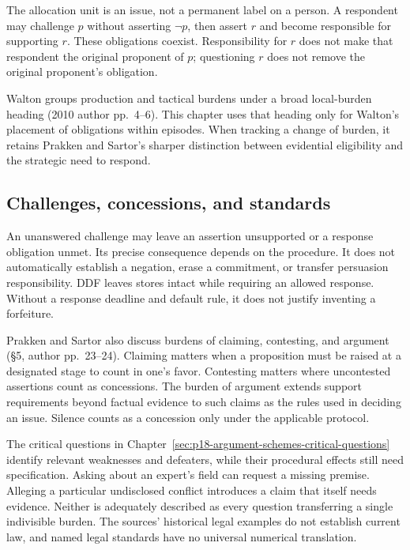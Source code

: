 The allocation unit is an issue, not a permanent label on a person.
A respondent may challenge \(p\) without asserting \(\neg p\), then
assert \(r\) and become responsible for supporting \(r\).
These obligations coexist. Responsibility for \(r\) does not make
that respondent the original proponent of \(p\); questioning \(r\)
does not remove the original proponent's obligation.

Walton groups production and tactical burdens under a broad local-burden
heading (2010 author pp.~4--6). This chapter uses that heading only
for Walton's placement of obligations within episodes. When tracking
a change of burden, it retains Prakken and Sartor's sharper distinction
between evidential eligibility and the strategic need to respond.

\subsection{Challenges, concessions, and standards}

An unanswered challenge may leave an assertion unsupported or a
response obligation unmet. Its precise consequence depends on the
procedure. It does not automatically establish a negation, erase a
commitment, or transfer persuasion responsibility. DDF leaves stores
intact while requiring an allowed response. Without a response deadline
and default rule, it does not justify inventing a forfeiture.

Prakken and Sartor also discuss burdens of claiming, contesting, and
argument (\S5, author pp.~23--24). Claiming matters when a proposition
must be raised at a designated stage to count in one's favor.
Contesting matters where uncontested assertions count as concessions.
The burden of argument extends support requirements beyond factual
evidence to such claims as the rules used in deciding an issue.
Silence counts as a concession only under the applicable protocol.

The critical questions in
Chapter~\ref{sec:p18-argument-schemes-critical-questions}
identify relevant weaknesses and defeaters, while their procedural
effects still need specification. Asking about an expert's field can
request a missing premise. Alleging a particular undisclosed conflict
introduces a claim that itself needs evidence. Neither is adequately
described as every question transferring a single indivisible burden.
The sources' historical legal examples do not establish current law,
and named legal standards have no universal numerical translation.

